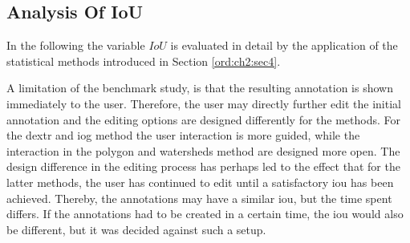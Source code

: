 \begin{table}[h!]
	\centering
	\caption[Correlation table]{
		Correlation table based on the \textit{Pearson} standard correlation coefficient \cite{Kirch08-CorrPearson}.
		The redundant part of the table was left empty. 
		The variables $ n_{clicks} $, $ n_{strokes} $, $ time_{strokes} $, and $ ws $ all show a intermediate correlation with $ time_{annot} $, while their combination $ cws $ shows a strong correlation. 
		The correlation between $ IoU $ and $ time_{annot} $ indicates almost not relationship $ 0.0379 $.
	}\label{tab:ch5:correlation-matrix}
\end{table}


\subsection{Analysis Of IoU}\label{ord:ch5:sec1:subsec2}

In the following the variable $IoU$ is evaluated in detail by the application of the statistical methods introduced in Section \ref{ord:ch2:sec4}.

A limitation of the benchmark study, is that the resulting annotation is shown immediately to the user.
Therefore, the user may directly further edit the initial annotation and the editing options are designed differently for the methods.
For the \gls{dextr} and \gls{iog} method the user interaction is more guided, while the interaction in the polygon and watersheds method are designed more open.
The design difference in the editing process has perhaps led to the effect that for the latter methods, the user has continued to edit until a satisfactory \gls{iou} has been achieved.
Thereby, the annotations may have a similar \gls{iou}, but the time spent differs.
If the annotations had to be created in a certain time, the \gls{iou} would also be different, but it was decided against such a setup.

